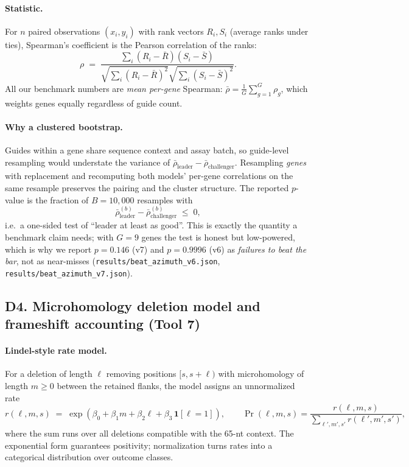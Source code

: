 \paragraph{Statistic.} For $n$ paired observations $(x_i, y_i)$ with rank
vectors $R_i, S_i$ (average ranks under ties), Spearman's coefficient is
the Pearson correlation of the ranks:
\begin{equation}
\rho \;=\; \frac{\sum_i (R_i - \bar{R})(S_i - \bar{S})}
{\sqrt{\sum_i (R_i - \bar{R})^2}\sqrt{\sum_i (S_i - \bar{S})^2}}.
\end{equation}
All our benchmark numbers are \emph{mean per-gene} Spearman:
$\bar{\rho} = \tfrac{1}{G}\sum_{g=1}^{G} \rho_g$, which weights genes
equally regardless of guide count.
\paragraph{Why a clustered bootstrap.} Guides within a gene share sequence
context and assay batch, so guide-level resampling would understate the
variance of $\bar{\rho}_{\text{leader}} - \bar{\rho}_{\text{challenger}}$.
Resampling \emph{genes} with replacement and recomputing both models'
per-gene correlations on the same resample preserves the pairing and the
cluster structure. The reported $p$-value is the fraction of $B = 10{,}000$
resamples with
\begin{equation}
\bar{\rho}^{(b)}_{\text{leader}} - \bar{\rho}^{(b)}_{\text{challenger}} \;\le\; 0,
\end{equation}
i.e.\ a one-sided test of ``leader at least as good''. This is exactly the
quantity a benchmark claim needs; with $G = 9$ genes the test is honest
but low-powered, which is why we report $p = 0.146$ (v7) and $p = 0.9996$
(v6) as \emph{failures to beat the bar}, not as near-misses
(\texttt{results/beat\_azimuth\_v6.json}, \texttt{results/beat\_azimuth\_v7.json}).

\subsection{D4. Microhomology deletion model and frameshift accounting (Tool 7)}
\paragraph{Lindel-style rate model.} For a deletion of length $\ell$
removing positions $[s, s+\ell)$ with microhomology of length $m \ge 0$
between the retained flanks, the model assigns an unnormalized rate
\begin{equation}
r(\ell, m, s) \;=\; \exp\!\left(\beta_0 + \beta_1 m + \beta_2 \ell + \beta_3\, \mathbf{1}[\ell = 1]\right),
\qquad
\Pr(\ell, m, s) = \frac{r(\ell,m,s)}{\sum_{\ell', m', s'} r(\ell',m',s')},
\label{eq:lindel}
\end{equation}
where the sum runs over all deletions compatible with the 65-nt context.
The exponential form guarantees positivity; normalization turns rates into
a categorical distribution over outcome classes.
